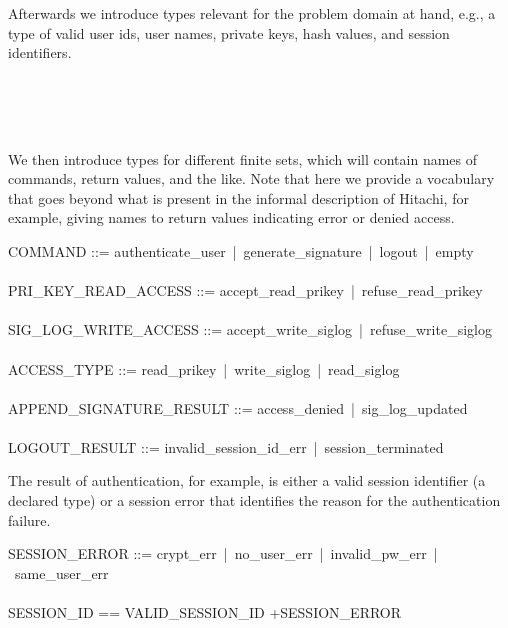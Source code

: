 \documentclass[a4paper,pdftex]{article}
\newcommand{\pplus}{+}
\begin{document}
Afterwards we introduce types relevant for the problem domain at hand, e.g.,
a type of valid user ids, user names, private keys, hash values, and
session identifiers.
\begin{zed}
\\
\\
[VALID\_SIGNATURE,USER\_NAME,CHAR] \\
\end{zed} 

We then introduce types for different finite sets, which will 
contain names of commands, return values, and the like.  Note that here we
provide a vocabulary that goes beyond what is present in the informal
description of Hitachi, for example, giving names to return values
indicating error or denied access.

\begin{zed}
COMMAND ::= authenticate\_user~|~generate\_signature~|~logout~|~empty\\
\\
PRI\_KEY\_READ\_ACCESS ::= accept\_read\_prikey~|~refuse\_read\_prikey \\
\\
SIG\_LOG\_WRITE\_ACCESS ::= accept\_write\_siglog~|~refuse\_write\_siglog\\
\\
ACCESS\_TYPE ::= read\_prikey~|~write\_siglog~|~read\_siglog\\
\\
APPEND\_SIGNATURE\_RESULT ::= access\_denied~|~sig\_log\_updated \\
\\
LOGOUT\_RESULT ::= invalid\_session\_id\_err~|~session\_terminated
\end{zed}

The result of authentication, for example, is either a valid session identifier
(a declared type) or a session error that identifies the 
reason for the authentication failure.
\index{}
\index{}
\index{}
\begin{zed}
SESSION\_ERROR ::= crypt\_err~|~no\_user\_err~|~invalid\_pw\_err~|~same\_user\_err\\
\\
SESSION\_ID == VALID\_SESSION\_ID \pplus SESSION\_ERROR
\end{zed}
\end{document}
